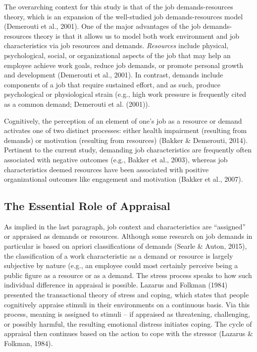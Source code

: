 \documentclass[
  english,
  man]{apa6}
\begin{document}
The overarching context for this study is that of the job demands-resources theory, which is an expansion of the well-studied job demands-resources model (Demerouti et al., 2001). One of the major advantages of the job demands-resources theory is that it allows us to model both work environment and job characteristics via job resources and demands. \emph{Resources} include physical, psychological, social, or organizational aspects of the job that may help an employee achieve work goals, reduce job demands, or promote personal growth and development (Demerouti et al., 2001). In contrast, demands include components of a job that require sustained effort, and as such, produce psychological or physiological strain (e.g., high work pressure is frequently cited as a common demand; Demerouti et al. (2001)).

Cognitively, the perception of an element of one's job as a resource or demand activates one of two distinct processes: either health impairment (resulting from demands) or motivation (resulting from resources) (Bakker \& Demerouti, 2014). Pertinent to the current study, demanding job characteristics are frequently often associated with negative outcomes (e.g., Bakker et al., 2003), whereas job characteristics deemed resources have been associated with positive organizational outcomes like engagement and motivation (Bakker et al., 2007).

\hypertarget{the-essential-role-of-appraisal}{%
\subsection{The Essential Role of Appraisal}\label{the-essential-role-of-appraisal}}

As implied in the last paragraph, job context and characteristics are \enquote{assigned} or appraised as demands or resources. Although some research on job demands in particular is based on apriori classifications of demands (Searle \& Auton, 2015), the classification of a work characteristic as a demand or resource is largely subjective by nature (e.g., an employee could most certainly perceive being a public figure as a resource or as a demand. The stress process speaks to how such individual difference in appraisal is possible. Lazarus and Folkman (1984) presented the transactional theory of stress and coping, which states that people cognitively appraise stimuli in their environments on a continuous basis. Via this process, meaning is assigned to stimuli -- if appraised as threatening, challenging, or possibly harmful, the resulting emotional distress initiates coping. The cycle of appraisal then continues based on the action to cope with the stressor (Lazarus \& Folkman, 1984).
\end{document}
